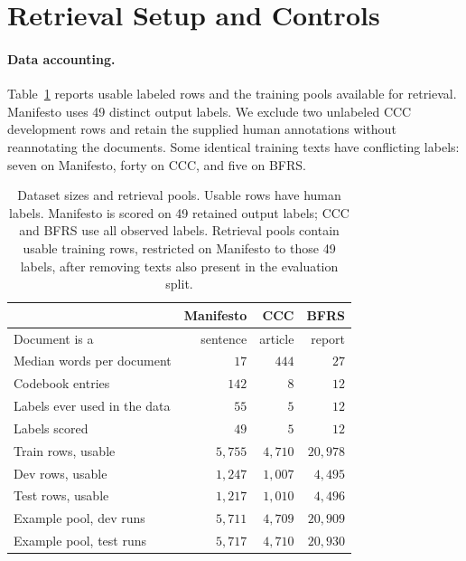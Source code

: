 \documentclass[11pt]{article}
\begin{document}
\section{Retrieval Setup and Controls}
\label{app:exrag}

\paragraph{Data accounting.}
Table~\ref{tab:data} reports usable labeled rows and the training pools available for retrieval. Manifesto uses 49 distinct output labels. We exclude two unlabeled CCC development rows and retain the supplied human annotations without reannotating the documents. Some identical training texts have conflicting labels: seven on Manifesto, forty on CCC, and five on BFRS.

\begin{table}[!t]
\centering
\begin{tabular}{lrrr}
\toprule
 & Manifesto & CCC & BFRS \\
\midrule
Document is a & sentence & article & report \\
Median words per document & $17$ & $444$ & $27$ \\
\midrule
Codebook entries & $142$ & $8$ & $12$ \\
Labels ever used in the data & $55$ & $5$ & $12$ \\
Labels scored & $49$ & $5$ & $12$ \\
\midrule
Train rows, usable & $5{,}755$ & $4{,}710$ & $20{,}978$ \\
Dev rows, usable & $1{,}247$ & $1{,}007$ & $4{,}495$ \\
Test rows, usable & $1{,}217$ & $1{,}010$ & $4{,}496$ \\
\midrule
Example pool, dev runs & $5{,}711$ & $4{,}709$ & $20{,}909$ \\
Example pool, test runs & $5{,}717$ & $4{,}710$ & $20{,}930$ \\
\bottomrule
\end{tabular}
\caption{Dataset sizes and retrieval pools. Usable rows have human labels. Manifesto is scored on 49 retained output labels; CCC and BFRS use all observed labels. Retrieval pools contain usable training rows, restricted on Manifesto to those 49 labels, after removing texts also present in the evaluation split.}
\label{tab:data}
\end{table}
\end{document}
